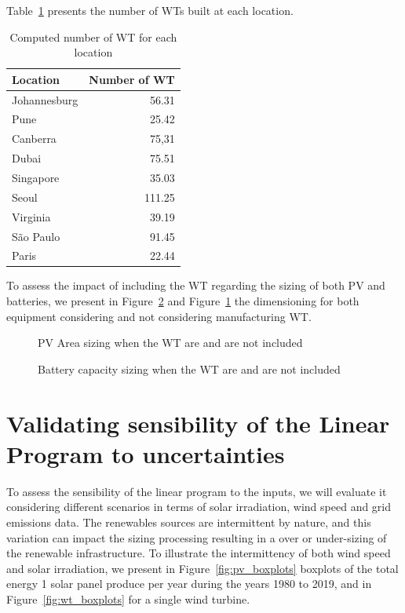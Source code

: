 Table~\ref{tab:results_wt} presents the number of WTs  built at each location.

\begin{table}[H]
  
  \caption{Computed number of WT for each location}\label{tab:results_wt} \centering
  \begin{tabular}{|l|r|}
  \hline
    
  \textbf{Location} &   \textbf{Number of WT} \\
  \hline
  Johannesburg & 56.31   \\
  \hline
  Pune  & 25.42 \\
  \hline
  Canberra  & 75,31 \\
  \hline
  Dubai   &  75.51  \\
  \hline
  Singapore & 35.03  \\
  \hline     
  Seoul    & 111.25  \\
  \hline
  Virginia   & 39.19 \\
  \hline
  São Paulo   & 91.45 \\
  \hline 
  Paris    &    22.44 \\
  \hline
    
\end{tabular}  
\end{table}


To assess the impact of including the WT regarding the sizing of both PV and batteries, we present in Figure~\ref{fig:wind_bat} and Figure~\ref{fig:wind_pv}  the dimensioning for both equipment considering and not considering manufacturing WT. 

\begin{figure}[H]
  \centering
  {}
  \caption{PV Area sizing when the WT are and are not included }
  \label{fig:wind_pv}
\end{figure}


\begin{figure}[H]
  \centering
  {}
  \caption{Battery capacity sizing when the WT are and are not included }
  \label{fig:wind_bat}
\end{figure}

\section{Validating sensibility of the Linear Program to  uncertainties}

To assess the sensibility of the linear program to the inputs, we will evaluate it considering different scenarios in terms of solar irradiation, wind speed and grid emissions data. The renewables sources are intermittent by nature, and this variation can impact the sizing processing resulting in a over or under-sizing of the renewable infrastructure. To illustrate the intermittency of both wind speed and solar irradiation, we present in Figure~\ref{fig:pv_boxplots} boxplots of the total energy 1 solar panel produce per year during the years 1980 to 2019, and in Figure~\ref{fig:wt_boxplots} for a single wind turbine.


